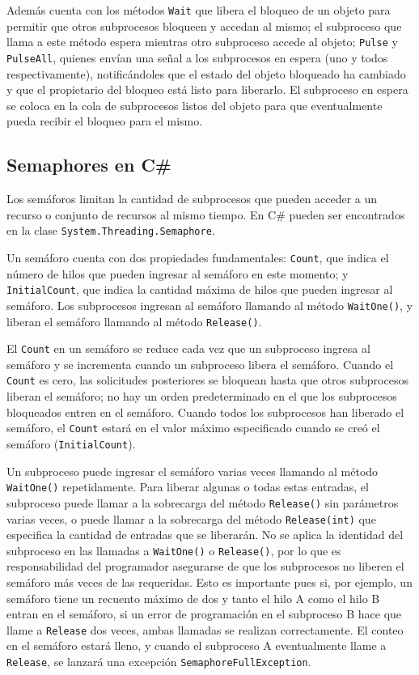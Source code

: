 \documentclass[10pt]{article} %
\newcommand{\csl}[1]{\colorbox{backcolour}{\texttt{#1}}}
\begin{document}
Adem\'as cuenta con los m\'etodos \csl{Wait} que libera el bloqueo de un objeto para permitir que otros subprocesos bloqueen y accedan al mismo; el subproceso que llama a este m\'etodo espera mientras otro subproceso accede al objeto; \csl{Pulse} y \csl{PulseAll}, quienes env\'ian una señal a los subprocesos en espera (uno y todos respectivamente), notific\'andoles que el estado del objeto bloqueado ha cambiado y que el propietario del bloqueo está listo para liberarlo. El subproceso en espera se coloca en la cola de subprocesos listos del objeto para que eventualmente pueda recibir el bloqueo para el mismo. 

\subsection{Semaphores en C\#}

Los sem\'aforos limitan la cantidad de subprocesos que pueden acceder a un recurso o conjunto de recursos al mismo tiempo. En C\# pueden ser encontrados en la clase \csl{System.Threading.Semaphore}.

Un sem\'aforo cuenta con dos propiedades fundamentales: \csl{Count}, que indica el n\'umero de hilos que pueden ingresar al sem\'aforo en este momento; y \csl{InitialCount}, que indica la cantidad m\'axima de hilos que pueden ingresar al sem\'aforo. Los subprocesos ingresan al semáforo llamando al método \csl{WaitOne()}, y liberan el semáforo llamando al método \csl{Release()}.

El \csl{Count} en un semáforo se reduce cada vez que un subproceso ingresa al semáforo y se incrementa cuando un subproceso libera el semáforo. Cuando el \csl{Count} es cero, las solicitudes posteriores se bloquean hasta que otros subprocesos liberan el semáforo; no hay un orden predeterminado en el que los subprocesos bloqueados entren en el semáforo. Cuando todos los subprocesos han liberado el semáforo, el \csl{Count} estar\'a en el valor máximo especificado cuando se creó el semáforo (\csl{InitialCount}).

Un subproceso puede ingresar el semáforo varias veces llamando al método \csl{WaitOne()} repetidamente. Para liberar algunas o todas estas entradas, el subproceso puede llamar a la sobrecarga del método \csl{Release()} sin parámetros varias veces, o puede llamar a la sobrecarga del método \csl{Release(int)} que especifica la cantidad de entradas que se liberarán. No se aplica la identidad del subproceso en las llamadas a \csl{WaitOne()} o \csl{Release()}, por lo que es responsabilidad del programador asegurarse de que los subprocesos no liberen el semáforo m\'as veces de las requeridas. Esto es importante pues si, por ejemplo, un semáforo tiene un recuento máximo de dos y tanto el hilo A como el hilo B entran en el semáforo, si un error de programación en el subproceso B hace que llame a \csl{Release} dos veces, ambas llamadas se realizan correctamente. El conteo en el semáforo estar\'a lleno, y cuando el subproceso A eventualmente llame a \csl{Release}, se lanzar\'a una excepci\'on \csl{SemaphoreFullException}.
\end{document}
